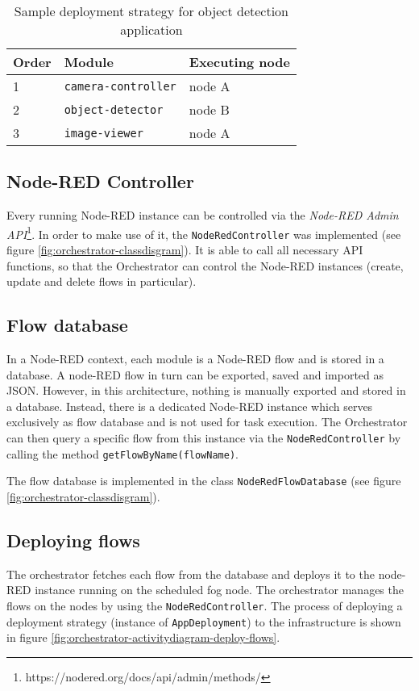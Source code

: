 \begin{table}[htb]
    \centering
    \begin{tabular}{|m{1.5cm}|m{4cm}|m{3.5cm}|}
        \hline
        \textbf{Order} & \textbf{Module} & \textbf{Executing node}\\
        \hline
        1 & \texttt{camera-controller} & node A\\
        \hline
        2 & \texttt{object-detector} & node B\\
        \hline
        3 & \texttt{image-viewer} & node A\\
        \hline
    \end{tabular}
    \caption{Sample deployment strategy for object detection application}
    \label{tab:deployment-strategy-example}
\end{table}

\subsection*{Node-RED Controller}

Every running Node-RED instance can be controlled via the \textit{Node-RED Admin API}\footnote{https://nodered.org/docs/api/admin/methods/}. In order to make use of it, the \texttt{NodeRedController} was implemented (see figure \ref{fig:orchestrator-classdisgram}). It is able to call all necessary API functions, so that the Orchestrator can control the Node-RED instances (create, update and delete flows in particular).

\subsection*{Flow database}
In a Node-RED context, each module is a Node-RED flow and is stored in a database. A node-RED flow in turn can be exported, saved and imported as JSON. However, in this architecture, nothing is manually exported and stored in a database. Instead, there is a dedicated Node-RED instance which serves exclusively as flow database and is not used for task execution. The Orchestrator can then query a specific flow from this instance via the \texttt{NodeRedController} by calling the method \texttt{getFlowByName(flowName)}.

The flow database is implemented in the class \texttt{NodeRedFlowDatabase} (see figure \ref{fig:orchestrator-classdisgram}).

\subsection*{Deploying flows}
The orchestrator fetches each flow from the database and deploys it to the node-RED instance running on the scheduled fog node. The orchestrator manages the flows on the nodes by using the \texttt{NodeRedController}. The process of deploying a deployment strategy (instance of \texttt{AppDeployment}) to the infrastructure is shown in figure \ref{fig:orchestrator-activitydiagram-deploy-flows}.

